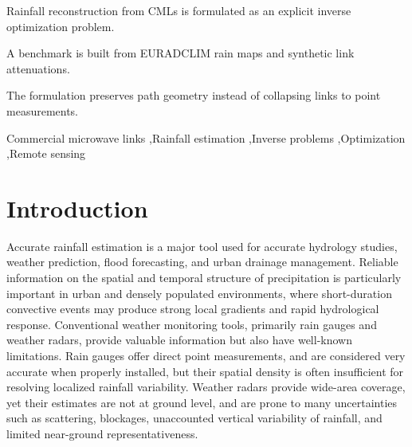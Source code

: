 \documentclass[a4paper,fleqn]{cas-sc}
\begin{document}
\begin{highlights}
  \item Rainfall reconstruction from CMLs is formulated as an explicit inverse optimization problem.
  \item A benchmark is built from EURADCLIM rain maps and synthetic link attenuations.
  \item The formulation preserves path geometry instead of collapsing links to point measurements.
\end{highlights}

\begin{keywords}
  Commercial microwave links \sep Rainfall estimation \sep Inverse problems \sep Optimization \sep Remote sensing
\end{keywords}

\maketitle


\section{Introduction}

Accurate rainfall estimation is a major tool used for accurate hydrology studies, weather prediction, flood forecasting, and urban drainage management. Reliable information on the spatial and temporal structure of precipitation is particularly important in urban and densely populated environments, where short-duration convective events may produce strong local gradients and rapid hydrological response. Conventional weather monitoring tools, primarily rain gauges and weather radars, provide valuable information but also have well-known limitations. Rain gauges offer direct point measurements, and are considered very accurate when properly installed, but their spatial density is often insufficient for resolving localized rainfall variability. Weather radars provide wide-area coverage, yet their estimates are not at ground level, and are prone to many uncertainties such as scattering, blockages, unaccounted vertical variability of rainfall, and limited near-ground representativeness.
\end{document}
